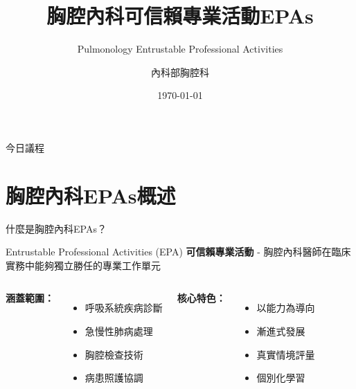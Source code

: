 \documentclass[aspectratio=169]{beamer}
\title{胸腔內科可信賴專業活動EPAs}
\subtitle{Pulmonology Entrustable Professional Activities}
\author{內科部胸腔科}
\date{\today}
\institute{醫學中心}
\begin{document}
\begin{frame}
\titlepage
\end{frame}

\begin{frame}{今日議程}
\tableofcontents
\end{frame}

\section{胸腔內科EPAs概述}

\begin{frame}{什麼是胸腔內科EPAs？}
\begin{block}{Entrustable Professional Activities (EPA)}
\textbf{可信賴專業活動} - 胸腔內科醫師在臨床實務中能夠獨立勝任的專業工作單元
\end{block}

\vspace{0.5cm}

\begin{columns}[c]
\textbf{涵蓋範圍：}
\begin{itemize}
\item 呼吸系統疾病診斷
\item 急慢性肺病處理
\item 胸腔檢查技術
\item 病患照護協調
\end{itemize}

\textbf{核心特色：}
\begin{itemize}
\item 以能力為導向
\item 漸進式發展
\item 真實情境評量
\item 個別化學習
\end{itemize}
\end{columns}
\end{frame}
\end{document}
